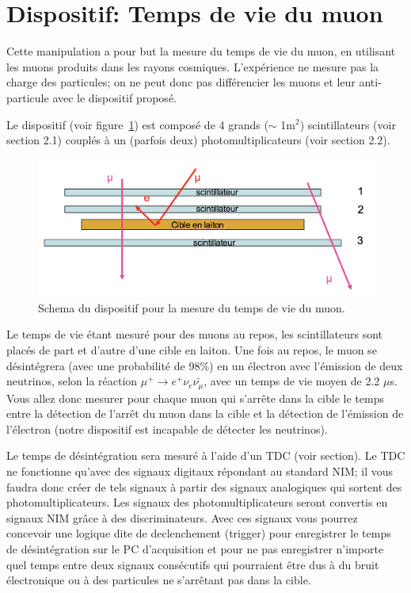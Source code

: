 \section{Dispositif: Temps de vie du muon}
Cette manipulation a pour but la mesure du temps de vie du muon, en utilisant
les muons produits dans les rayons cosmiques. L'exp\'erience ne mesure pas la
charge des particules; on ne peut donc pas diff\'erencier les muons et
leur anti-particule avec le dispositif propos\'e.

Le dispositif (voir figure~\ref{fig:TpsVieMuon_disp}) est compos\'e de 4 grands ($\sim$ 1m$^2$) scintillateurs (voir section
2.1) coupl\'es \`a un (parfois deux) photomultiplicateurs (voir section 2.2).

\begin{figure}[!h]
    \centering
	\includegraphics[width=\textwidth]{figures/Schema-Tps-de-vie.png}
    \caption{Schema du dispositif pour la mesure du temps de vie du muon.}
    \label{fig:TpsVieMuon_disp} 
\end{figure}

Le temps de vie \'etant mesur\'e pour des muons au repos, les scintillateurs sont plac\'es de part et d'autre d'une cible en laiton.
Une fois au repos, le muon se d\'esint\'egrera (avec une probabilit\'e de 98$\%$) en un
\'electron avec l'\'emission de deux neutrinos, selon la r\'eaction
$\mu^+ \rightarrow e^+ \nu_e \bar{\nu_{\mu}}$, avec un temps de vie moyen de 2.2 $\mu$s.
Vous allez donc mesurer pour chaque muon qui s'arr\^ete dans la cible le temps
entre la d\'etection de l'arr\^et du muon dans la cible et la d\'etection de
l'\'emission de l'\'electron (notre dispositif est incapable de d\'etecter
les neutrinos).

Le temps de d\'esint\'egration sera mesur\'e \`a l'aide d'un TDC (voir section).
Le TDC ne fonctionne qu'avec des signaux digitaux répondant au standard NIM;
il vous faudra donc cr\'eer de tels signaux \`a  partir des signaux analogiques
qui sortent des photomultiplicateurs. Les signaux des photomultiplicateurs seront convertis en signaux NIM grâce à des discriminateurs. Avec ces signaux vous
pourrez concevoir une logique dite de declenchement (trigger) pour enregistrer
le temps de d\'esint\'egration sur le PC d'acquisition et pour ne pas
enregistrer n'importe quel temps entre deux signaux consécutifs qui pourraient
\^etre dus \`a du bruit \'electronique ou \`a des particules ne s'arr\^etant pas dans la cible.

